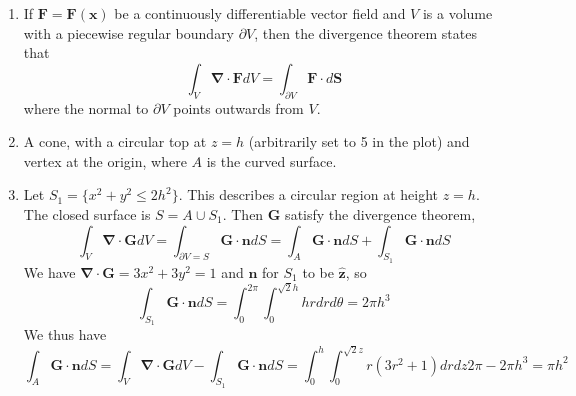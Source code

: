 \documentclass[a4paper]{article}
\begin{document}
\begin{ans}\leavevmode
\begin{enumerate}[label=(\alph*)]
    \item If $\mathbf{F}=\mathbf{F}(\mathbf{x})$ be a continuously differentiable vector field and $V$ is a volume with a piecewise regular boundary $\partial V$, then the divergence theorem states that
$$\int_V\boldsymbol{\nabla}\cdot\mathbf{F}dV=\int_{\partial V}\mathbf{F}\cdot d\mathbf{S}$$
where the normal to $\partial V$ points outwards from $V$.
\item A cone, with a circular top at $z=h$ (arbitrarily set to 5 in the plot) and vertex at the origin, where $A$ is the curved surface.
\begin{center}
\end{center}
\item Let $S_1=\{x^2+y^2\leq 2h^2\}$. This describes a circular region at height $z=h$. The closed surface is $S=A\cup S_1$. Then $\mathbf{G}$ satisfy the divergence theorem,
$$\int_V\boldsymbol{\nabla}\cdot\mathbf{G}dV=\int_{\partial V=S}\mathbf{G}\cdot\mathbf{n}dS=\int_A\mathbf{G}\cdot\mathbf{n}dS+\int_{S_1}\mathbf{G}\cdot\mathbf{n}dS$$
We have $\boldsymbol{\nabla}\cdot\mathbf{G}=3x^2+3y^2=1$ and $\mathbf{n}$ for $S_1$ to be $\mathbf{\hat{z}}$, so
$$\int_{S_1}\mathbf{G}\cdot\mathbf{n}dS=\int_0^{2\pi}\int_0^{\sqrt{2}h}hrdrd\theta=2\pi h^3$$
We thus have
$$\int_A\mathbf{G}\cdot\mathbf{n}dS=\int_V\boldsymbol{\nabla}\cdot\mathbf{G}dV-\int_{S_1}\mathbf{G}\cdot\mathbf{n}dS=\int_0^h\int_0^{\sqrt{2}z}r(3r^2+1)drdz2\pi-2\pi h^3=\pi h^2$$
\end{enumerate}


\end{ans}
\newpage
\end{document}
